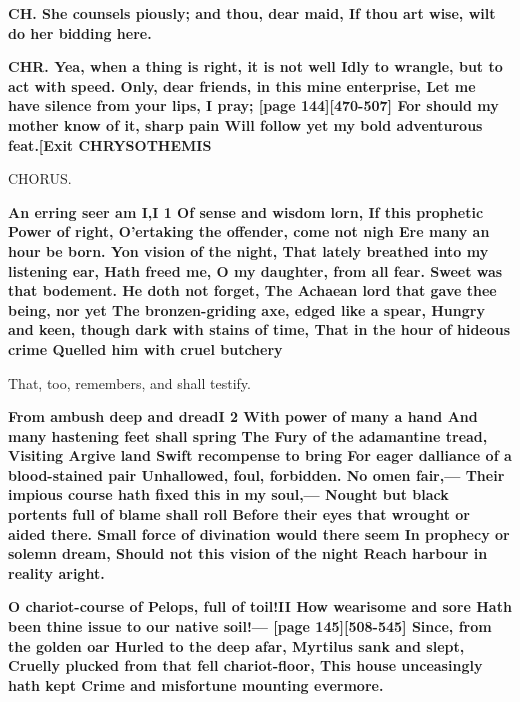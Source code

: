 \documentclass[11pt,letter]{book}
\begin{document}
\par \textbf{CH. She counsels piously; and thou, dear maid, If thou art wise, wilt do her bidding here.}
\par 

\par \textbf{CHR. Yea, when a thing is right, it is not well Idly to wrangle, but to act with speed. Only, dear friends, in this mine enterprise, Let me have silence from your lips, I pray; [page 144][470-507] For should my mother know of it, sharp pain Will follow yet my bold adventurous feat.[Exit CHRYSOTHEMIS}
\par 

\par  CHORUS.

\par \textbf{An erring seer am I,I 1 Of sense and wisdom lorn, If this prophetic Power of right, O’ertaking the offender, come not nigh Ere many an hour be born. Yon vision of the night, That lately breathed into my listening ear, Hath freed me, O my daughter, from all fear. Sweet was that bodement. He doth not forget, The Achaean lord that gave thee being, nor yet The bronzen-griding axe, edged like a spear, Hungry and keen, though dark with stains of time, That in the hour of hideous crime Quelled him with cruel butchery}
\par   That, too, remembers, and shall testify.

\par \textbf{From ambush deep and dreadI 2 With power of many a hand And many hastening feet shall spring The Fury of the adamantine tread, Visiting Argive land Swift recompense to bring For eager dalliance of a blood-stained pair Unhallowed, foul, forbidden. No omen fair,— Their impious course hath fixed this in my soul,— Nought but black portents full of blame shall roll Before their eyes that wrought or aided there. Small force of divination would there seem In prophecy or solemn dream, Should not this vision of the night Reach harbour in reality aright.}
\par 

\par \textbf{O chariot-course of Pelops, full of toil!II How wearisome and sore Hath been thine issue to our native soil!— [page 145][508-545] Since, from the golden oar Hurled to the deep afar, Myrtilus sank and slept, Cruelly plucked from that fell chariot-floor, This house unceasingly hath kept Crime and misfortune mounting evermore.}
\par 
\end{document}
